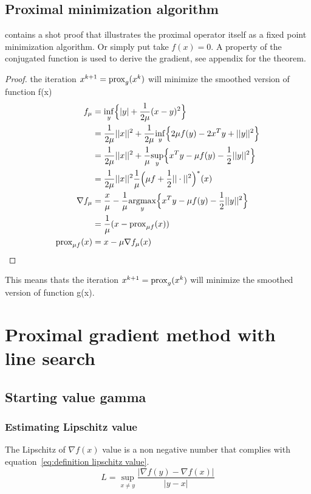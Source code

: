 	\subsection{Proximal minimization algorithm}
		 \cite{QianYang} contains a shot proof that illustrates the proximal operator itself as a fixed point minimization algorithm. Or simply put take $f(x)=0$.  A property of the conjugated function is used to derive the gradient, see appendix for the theorem.
		 \begin{proof}
		 	the iteration $x^{k+1}=\operatorname{prox}_g(x^k)$ will minimize the smoothed version of function f(x) 
		 	\begin{align*}
		 	f_{\mu}
		 	&= \underset{y}{\inf}\Big\{ |y| +\frac{1}{2 \mu}(x-y)^2 \Big\} \\
		 	&=   \frac{1}{2 \mu}||x||^2 + \frac{1}{2\mu} 
		 	\underset{y}{\inf}\Big\{
		 	2 \mu f(y) - 2x^T y + ||y||^2
		 	\Big\} \\
		 	&=  \frac{1}{2 \mu}||x||^2 + \frac{1}{\mu} 
		 	\underset{y}{\sup}\Big\{
		 	x^T y  - \mu f(y) - \frac{1}{2} ||y||^2 \Big \} \\
		 	&= \frac{1}{2\mu }||x||^2 \frac{1}{\mu } \Big( \mu f + \frac{1}{2}||\cdot||^2 \Big)^* (x) \\
		 	\nabla  f_{\mu} 
		 	&= \frac{x}{\mu} - \frac{1}{\mu} \underset{y}{\operatorname{argmax}} 
		 	\Big \{ x^Ty - \mu f(y) - \frac{1}{2}||y||^2 \Big \}\\
		 	& = \frac{1}{\mu}(x - \operatorname{prox}_{\mu f}(x)) \\
		 	\operatorname{prox}_{\mu f}(x)
		 	& = x- \mu \nabla f_{\mu}(x)
		 	\end{align*}
		 	\label{prf:proximal minimiztion alg proof}
		 \end{proof}

		 This means thats the iteration $x^{k+1}=\operatorname{prox}_g(x^k)$ will minimize the smoothed version of function g(x). 

\section{Proximal gradient method with line search}
	\subsection{Starting value gamma }
		\subsubsection{Estimating Lipschitz value}
			The Lipschitz of $\nabla f(x)$ value is a non negative number that complies with equation~\ref{eq:definition lipschitz value}.
			\begin{equation}
			L = \underset{x \neq y}{\sup} \frac{|\nabla f(y)-\nabla f(x)|}{|y-x|}
			\label{eq:definition lipschitz value}
			\end{equation}
			
